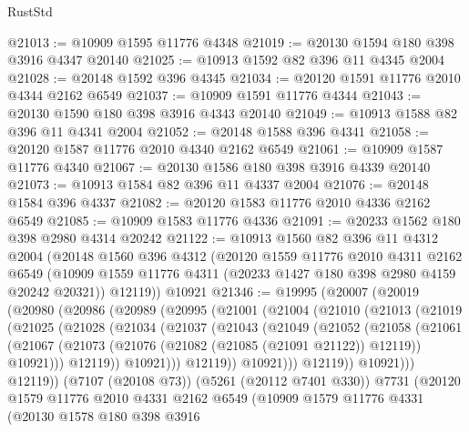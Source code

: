 \begin{lexlean}{RustStd}
\begin{coremodule}
@21013 := @10909 @1595 @11776 @4348
@21019 := @20130 @1594 @180 @398 @3916 @4347 @20140
@21025 := @10913 @1592 @82 @396 @11 @4345 @2004
@21028 := @20148 @1592 @396 @4345
@21034 := @20120 @1591 @11776 @2010 @4344 @2162 @6549
@21037 := @10909 @1591 @11776 @4344
@21043 := @20130 @1590 @180 @398 @3916 @4343 @20140
@21049 := @10913 @1588 @82 @396 @11 @4341 @2004
@21052 := @20148 @1588 @396 @4341
@21058 := @20120 @1587 @11776 @2010 @4340 @2162 @6549
@21061 := @10909 @1587 @11776 @4340
@21067 := @20130 @1586 @180 @398 @3916 @4339 @20140
@21073 := @10913 @1584 @82 @396 @11 @4337 @2004
@21076 := @20148 @1584 @396 @4337
@21082 := @20120 @1583 @11776 @2010 @4336 @2162 @6549
@21085 := @10909 @1583 @11776 @4336
@21091 := @20233 @1562 @180 @398 @2980 @4314 @20242
@21122 := @10913
    @1560
    @82
    @396
    @11
    @4312
    @2004
    (@20148
      @1560
      @396
      @4312
      (@20120
        @1559
        @11776
        @2010
        @4311
        @2162
        @6549
        (@10909 @1559 @11776 @4311 (@20233 @1427 @180 @398 @2980 @4159 @20242 @20321))
        @12119))
    @10921
@21346 := @19995
    (@20007
      (@20019
        (@20980
          (@20986
            (@20989
              (@20995
                (@21001
                  (@21004
                    (@21010
                      (@21013
                        (@21019
                          (@21025
                            (@21028
                              (@21034
                                (@21037
                                  (@21043
                                    (@21049
                                      (@21052
                                        (@21058
                                          (@21061
                                            (@21067
                                              (@21073
                                                (@21076 (@21082 (@21085 (@21091 @21122)) @12119))
                                                @10921)))
                                          @12119))
                                      @10921)))
                                @12119))
                            @10921)))
                      @12119))
                  @10921)))
            @12119))
        (@7107 (@20108 @73))
        (@5261 (@20112 @7401 @330))
        @7731
        (@20120
          @1579
          @11776
          @2010
          @4331
          @2162
          @6549
          (@10909
            @1579
            @11776
            @4331
            (@20130
              @1578
              @180
              @398
              @3916

\end{coremodule}
\end{lexlean}
